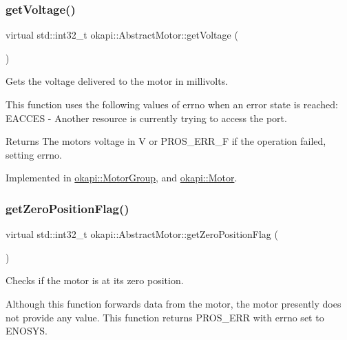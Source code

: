 \subsubsection{\texorpdfstring{getVoltage()}{getVoltage()}}
{\footnotesize\ttfamily virtual std\+::int32\+\_\+t okapi\+::\+Abstract\+Motor\+::get\+Voltage (\begin{DoxyParamCaption}{ }\end{DoxyParamCaption})\hspace{0.3cm}{\ttfamily [pure virtual]}}

Gets the voltage delivered to the motor in millivolts.

This function uses the following values of errno when an error state is reached\+: E\+A\+C\+C\+ES -\/ Another resource is currently trying to access the port.

\begin{DoxyReturn}{Returns}
The motor\textquotesingle{}s voltage in V or P\+R\+O\+S\+\_\+\+E\+R\+R\+\_\+F if the operation failed, setting errno. 
\end{DoxyReturn}


Implemented in \mbox{\hyperlink{classokapi_1_1MotorGroup_a399d4a16683c5498483f1f1e5e6307b5}{okapi\+::\+Motor\+Group}}, and \mbox{\hyperlink{classokapi_1_1Motor_af60eb970996183d86bd4786869f5adb0}{okapi\+::\+Motor}}.

\mbox{\label{classokapi_1_1AbstractMotor_a07079ee87a07b98b7008f2ce91c645ea}} 
\subsubsection{\texorpdfstring{getZeroPositionFlag()}{getZeroPositionFlag()}}
{\footnotesize\ttfamily virtual std\+::int32\+\_\+t okapi\+::\+Abstract\+Motor\+::get\+Zero\+Position\+Flag (\begin{DoxyParamCaption}{ }\end{DoxyParamCaption})\hspace{0.3cm}{\ttfamily [pure virtual]}}

Checks if the motor is at its zero position.

Although this function forwards data from the motor, the motor presently does not provide any value. This function returns P\+R\+O\+S\+\_\+\+E\+RR with errno set to E\+N\+O\+S\+YS.

